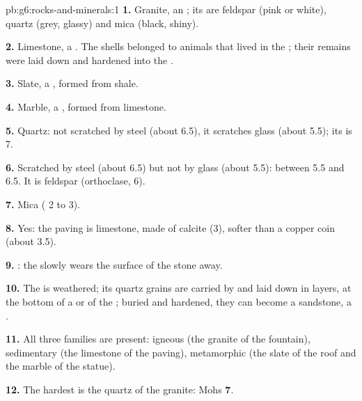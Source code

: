 \begin{solution}{pb:g6:rocks-and-minerals:1}
\textbf{1.} Granite, an ; its  are feldspar (pink or
white), quartz (grey, glassy) and mica (black, shiny).

\textbf{2.} Limestone, a . The shells belonged to animals
that lived in the ; their remains were laid down and hardened into
the .

\textbf{3.} Slate, a , formed from shale.

\textbf{4.} Marble, a , formed from limestone.

\textbf{5.} Quartz: not scratched by steel (about 6.5), it scratches glass
(about 5.5); its  is 7.

\textbf{6.} Scratched by steel (about 6.5) but not by glass (about 5.5):
between 5.5 and 6.5. It is feldspar (orthoclase, 6).

\textbf{7.} Mica ( 2 to 3).

\textbf{8.} Yes: the paving is limestone, made of calcite (3), softer than
a copper coin (about 3.5).

\textbf{9.} : the  slowly wears the surface of the stone
away.

\textbf{10.} The  is weathered; its quartz grains are carried by
 and laid down in layers, at the bottom of a  or of the ; buried
and hardened, they can become a sandstone, a .

\textbf{11.} All three families are present: igneous (the granite of the
fountain), sedimentary (the limestone of the paving), metamorphic (the
slate of the roof and the marble of the statue).

\textbf{12.} The hardest  is the quartz of the granite: Mohs
 \textbf{7}.
\end{solution}
